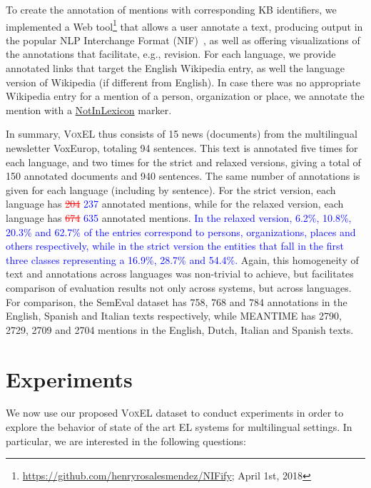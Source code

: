 \documentclass{llncs}
\begin{document}
To create the annotation of mentions with corresponding KB identifiers, we implemented a Web tool\footnote{\url{https://github.com/henryrosalesmendez/NIFify}; April 1st, 2018} that allows a user annotate a text, producing output in the popular NLP Interchange Format (NIF)~\cite{HellmannLAB13}, as well as offering visualizations of the annotations that facilitate, e.g., revision. For each language, we provide annotated links that target the English Wikipedia entry, as well the language version of Wikipedia (if different from English). In case there was no appropriate Wikipedia entry for a mention of a person, organization or place, we annotate the mention with a \url{NotInLexicon} marker.

In summary, \textsc{VoxEL} thus consists of 15 news (documents) from the multilingual newsletter VoxEurop, totaling 94 sentences. This text is annotated five times for each language, and two times for the strict and relaxed versions, giving a total of 150 annotated documents and 940 sentences. The same number of annotations is given for each language (including by sentence). For the strict version, each language has \textcolor{red}{\st{204}} \textcolor{blue}{237} annotated mentions, while for the relaxed version, each language has \textcolor{red}{\st{674}} \textcolor{blue}{635} annotated mentions. \textcolor{blue}{In the relaxed version, 6.2\%, 10.8\%, 20.3\% and 62.7\% of the entries correspond to persons, organizations, places and others respectively, while in the strict version the entities that fall in the first three classes representing a 16.9\%, 28.7\% and 54.4\%.} Again, this homogeneity of text and annotations across languages was non-trivial to achieve, but facilitates comparison of evaluation results not only across systems, but across languages. For comparison, the SemEval dataset has 758, 768 and 784 annotations in the English, Spanish and Italian texts respectively, while MEANTIME has 2790, 2729, 2709 and 2704 mentions in the English, Dutch, Italian and Spanish texts.

\section{Experiments}\label{sec:exp}

We now use our proposed \textsc{VoxEL} dataset to conduct experiments in order to explore the behavior of state of the art EL systems for multilingual settings. In particular, we are interested in the following questions:
\end{document}
